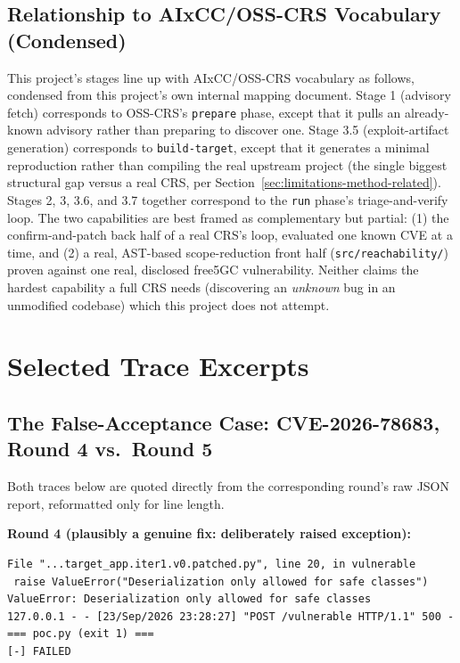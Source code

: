 \documentclass[12pt,a4paper]{report}
\begin{document}
\section{Relationship to AIxCC/OSS-CRS Vocabulary (Condensed)}
\label{app:crs-mapping}

This project's stages line up with AIxCC/OSS-CRS vocabulary as follows, condensed from this project's own internal mapping document. Stage 1 (advisory fetch) corresponds to OSS-CRS's \texttt{prepare} phase, except that it pulls an already-known advisory rather than preparing to discover one. Stage 3.5 (exploit-artifact generation) corresponds to \texttt{build-target}, except that it generates a minimal reproduction rather than compiling the real upstream project (the single biggest structural gap versus a real CRS, per Section~\ref{sec:limitations-method-related}). Stages 2, 3, 3.6, and 3.7 together correspond to the \texttt{run} phase's triage-and-verify loop. The two capabilities are best framed as complementary but partial: (1) the confirm-and-patch back half of a real CRS's loop, evaluated one known CVE at a time, and (2) a real, AST-based scope-reduction front half (\texttt{src/reachability/}) proven against one real, disclosed free5GC vulnerability. Neither claims the hardest capability a full CRS needs (discovering an \emph{unknown} bug in an unmodified codebase) which this project does not attempt.

\chapter{Selected Trace Excerpts}
\label{app:trace-excerpts}

\section{The False-Acceptance Case: CVE-2026-78683, Round 4 vs.\ Round 5}

Both traces below are quoted directly from the corresponding round's raw JSON report, reformatted only for line length.

\textbf{Round 4 (plausibly a genuine fix: deliberately raised exception):}
\begin{Verbatim}[fontsize=\scriptsize]
 File "...target_app.iter1.v0.patched.py", line 20, in vulnerable
 raise ValueError("Deserialization only allowed for safe classes")
ValueError: Deserialization only allowed for safe classes
127.0.0.1 - - [23/Sep/2026 23:28:27] "POST /vulnerable HTTP/1.1" 500 -
=== poc.py (exit 1) ===
[-] FAILED
\end{Verbatim}
\end{document}
